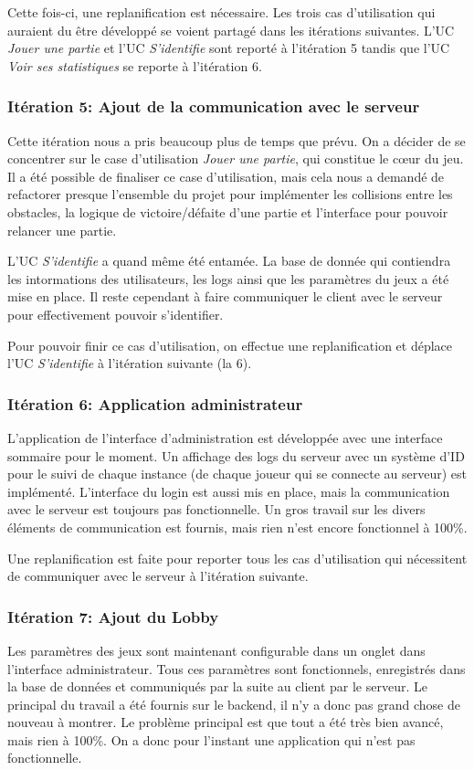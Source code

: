 \documentclass[a4paper,12pt]{article}
\begin{document}
	Cette fois-ci, une replanification est nécessaire. Les trois cas d'utilisation qui auraient du être développé se voient partagé dans les itérations suivantes. L'UC \textit{Jouer une partie} et l'UC \textit{S'identifie} sont reporté à l'itération 5 tandis que l'UC \textit{Voir ses statistiques} se reporte à l'itération 6.
	
	\subsubsection{Itération 5: Ajout de la communication avec le serveur}
	Cette itération nous a pris beaucoup plus de temps que prévu. On a décider de se concentrer sur le case d'utilisation \textit{Jouer une partie}, qui constitue le cœur du jeu. Il a été possible de finaliser ce case d'utilisation, mais cela nous a demandé de refactorer presque l'ensemble du projet pour implémenter les collisions entre les obstacles, la logique de victoire/défaite d'une partie et l'interface pour pouvoir relancer une partie.
	
	L'UC \textit{S'identifie} a quand même été entamée. La base de donnée qui contiendra les intormations des utilisateurs, les logs ainsi que les paramètres du jeux a été mise en place. Il reste cependant à faire communiquer le client avec le serveur pour effectivement pouvoir s'identifier.
	
	Pour pouvoir finir ce cas d'utilisation, on effectue une replanification et déplace l'UC \textit{S'identifie} à l'itération suivante (la 6).
	
	\subsubsection{Itération 6: Application administrateur}
	L'application de l'interface d'administration est développée avec une interface sommaire pour le moment. Un affichage des logs du serveur avec un système d'ID pour le suivi de chaque instance (de chaque joueur qui se connecte au serveur) est implémenté. L'interface du login est aussi mis en place, mais la communication avec le serveur est toujours pas fonctionnelle. Un gros travail sur les divers éléments de communication est fournis, mais rien n'est encore fonctionnel à 100\%.
	
	Une replanification est faite pour reporter tous les cas d'utilisation qui nécessitent de communiquer avec le serveur à l'itération suivante.
	
	\subsubsection{Itération 7: Ajout du Lobby}
	Les paramètres des jeux sont maintenant configurable dans un onglet dans l'interface administrateur. Tous ces paramètres sont fonctionnels, enregistrés dans la base de données et communiqués par la suite au client par le serveur. Le principal du travail a été fournis sur le backend, il n'y a donc pas grand chose de nouveau à montrer. Le problème principal est que tout a été très bien avancé, mais rien à 100\%. On a donc pour l'instant une application qui n'est pas fonctionnelle.
	
\end{document}
